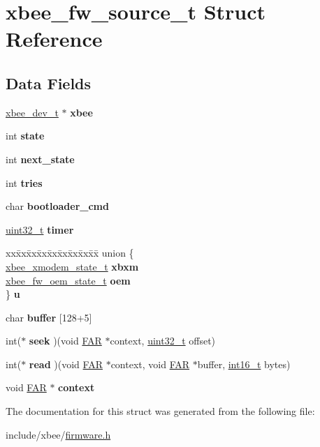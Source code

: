 \hypertarget{structxbee__fw__source__t}{}\section{xbee\+\_\+fw\+\_\+source\+\_\+t Struct Reference}
\label{structxbee__fw__source__t}
\subsection*{Data Fields}
\begin{DoxyCompactItemize}
\item 
\hyperlink{structxbee__dev__t}{xbee\+\_\+dev\+\_\+t} $\ast$ {\bfseries xbee}
\item 
int {\bfseries state}
\item 
int {\bfseries next\+\_\+state}
\item 
int {\bfseries tries}
\item 
char {\bfseries bootloader\+\_\+cmd}
\item 
\hyperlink{group__hal__dos_ga09a1e304d66d35dd47daffee9731edaa}{uint32\+\_\+t} {\bfseries timer}
\item 
\begin{tabbing}
xx\=xx\=xx\=xx\=xx\=xx\=xx\=xx\=xx\=\kill
union \{\\
\>\hyperlink{structxbee__xmodem__state__t}{xbee\_xmodem\_state\_t} {\bfseries xbxm}\\
\>\hyperlink{structxbee__fw__oem__state__t}{xbee\_fw\_oem\_state\_t} {\bfseries oem}\\
\} {\bfseries u}\\

\end{tabbing}\item 
char {\bfseries buffer} \mbox{[}128+5\mbox{]}
\item 
int($\ast$ {\bfseries seek} )(void \hyperlink{group__hal_gaef060b3456fdcc093a7210a762d5f2ed}{F\+AR} $\ast$context, \hyperlink{group__hal__dos_ga09a1e304d66d35dd47daffee9731edaa}{uint32\+\_\+t} offset)
\item 
int($\ast$ {\bfseries read} )(void \hyperlink{group__hal_gaef060b3456fdcc093a7210a762d5f2ed}{F\+AR} $\ast$context, void \hyperlink{group__hal_gaef060b3456fdcc093a7210a762d5f2ed}{F\+AR} $\ast$buffer, \hyperlink{group__hal__dos_ga2140805d08462d474b82ddc8d1c2f3e6}{int16\+\_\+t} bytes)
\item 
void \hyperlink{group__hal_gaef060b3456fdcc093a7210a762d5f2ed}{F\+AR} $\ast$ {\bfseries context}
\end{DoxyCompactItemize}


The documentation for this struct was generated from the following file\+:\begin{DoxyCompactItemize}
\item 
include/xbee/\hyperlink{firmware_8h}{firmware.\+h}\end{DoxyCompactItemize}

